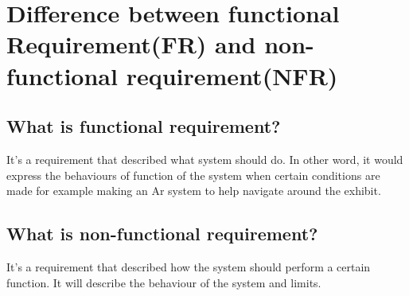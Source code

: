 

\section{Difference between functional Requirement(FR) and non-functional requirement(NFR)}

\subsection{What is functional requirement?}
It's a requirement that described what system should do. In other word, it would express the behaviours of function of the system when certain conditions are made for example making an Ar system to help navigate around the exhibit.

\subsection{What is non-functional requirement?}
It's a requirement that described how the system should perform a certain function. It will describe the behaviour of the system and limits.

